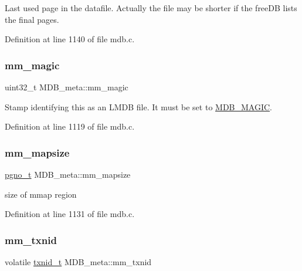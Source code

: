 Last used page in the datafile. Actually the file may be shorter if the free\+DB lists the final pages. 

Definition at line 1140 of file mdb.\+c.

\mbox{\label{struct_m_d_b__meta_a45631452dce29f76434d607005ff4495}} 
\subsubsection{\texorpdfstring{mm\+\_\+magic}{mm\_magic}}
{\footnotesize\ttfamily uint32\+\_\+t M\+D\+B\+\_\+meta\+::mm\+\_\+magic}

Stamp identifying this as an L\+M\+DB file. It must be set to \mbox{\hyperlink{group__internal_ga4cac6326c08147a019e8ddb17ad712f6}{M\+D\+B\+\_\+\+M\+A\+G\+IC}}. 

Definition at line 1119 of file mdb.\+c.

\mbox{\label{struct_m_d_b__meta_a25106c008801655d8d956b78a4699451}} 
\subsubsection{\texorpdfstring{mm\+\_\+mapsize}{mm\_mapsize}}
{\footnotesize\ttfamily \mbox{\hyperlink{group__internal_gadb65f0424c9d3827bf6409087ad555cd}{pgno\+\_\+t}} M\+D\+B\+\_\+meta\+::mm\+\_\+mapsize}

size of mmap region 

Definition at line 1131 of file mdb.\+c.

\mbox{\label{struct_m_d_b__meta_a87c674e0b87a14a768d4d3e5e785bb05}} 
\subsubsection{\texorpdfstring{mm\+\_\+txnid}{mm\_txnid}}
{\footnotesize\ttfamily volatile \mbox{\hyperlink{group__internal_gabbaef7c9c710f8652a62c32d748c040e}{txnid\+\_\+t}} M\+D\+B\+\_\+meta\+::mm\+\_\+txnid}


